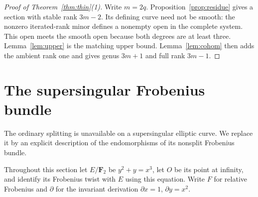 \documentclass[11pt]{article}
\theoremstyle{definition}\newtheorem{definition}[theorem]{Definition}
\theoremstyle{remark}\newtheorem{remark}[theorem]{Remark}
\newcommand{\FF}{\mathbf F}
\begin{document}
\begin{proof}[Proof of Theorem~\ref{thm:thin}(1)]
Write $m=2q$. Proposition~\ref{prop:residue} gives a section with stable rank $3m-2$. Its defining curve need not be smooth: the nonzero iterated-rank minor defines a nonempty open in the complete system. This open meets the smooth open because both degrees are at least three. Lemma~\ref{lem:upper} is the matching upper bound. Lemma~\ref{lem:cohom} then adds the ambient rank one and gives genus $3m+1$ and full rank $3m-1$.
\end{proof}

\section{The supersingular Frobenius bundle}\label{sec:ssbundle}

The ordinary splitting is unavailable on a supersingular elliptic curve. We replace it by an explicit description of the endomorphisms of its nonsplit Frobenius bundle.

Throughout this section let $E/\FF_2$ be $y^2+y=x^3$, let $O$ be its point at infinity, and identify its Frobenius twist with $E$ using this equation. Write $F$ for relative Frobenius and $\partial$ for the invariant derivation $\partial x=1$, $\partial y=x^2$.
\end{document}
